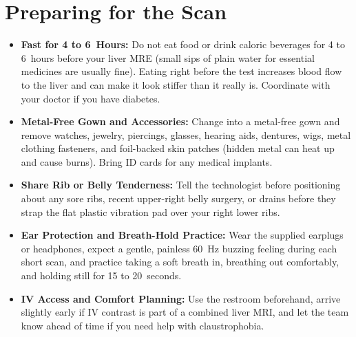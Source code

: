 \section{Preparing for the Scan}
\begin{itemize}
\item \textbf{Fast for 4 to 6~Hours:} Do not eat food or drink caloric beverages for 4 to 6~hours before your liver MRE (small sips of plain water for essential medicines are usually fine). Eating right before the test increases blood flow to the liver and can make it look stiffer than it really is. Coordinate with your doctor if you have diabetes.
\item \textbf{Metal-Free Gown and Accessories:} Change into a metal-free gown and remove watches, jewelry, piercings, glasses, hearing aids, dentures, wigs, metal clothing fasteners, and foil-backed skin patches (hidden metal can heat up and cause burns). Bring ID cards for any medical implants.
\item \textbf{Share Rib or Belly Tenderness:} Tell the technologist before positioning about any sore ribs, recent upper-right belly surgery, or drains before they strap the flat plastic vibration pad over your right lower ribs.
\item \textbf{Ear Protection and Breath-Hold Practice:} Wear the supplied earplugs or headphones, expect a gentle, painless 60~Hz buzzing feeling during each short scan, and practice taking a soft breath in, breathing out comfortably, and holding still for 15 to 20~seconds.
\item \textbf{IV Access and Comfort Planning:} Use the restroom beforehand, arrive slightly early if IV contrast is part of a combined liver MRI, and let the team know ahead of time if you need help with claustrophobia.
\end{itemize}

